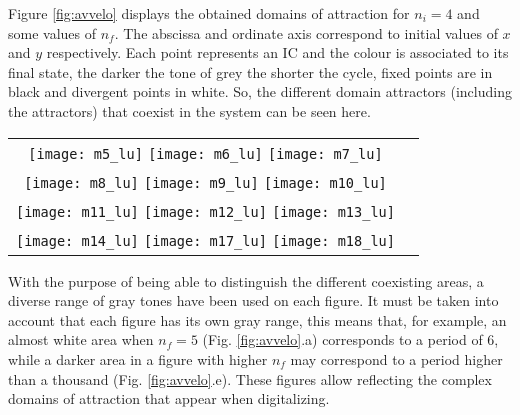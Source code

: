 Figure \ref{fig:avvelo} displays the obtained domains of attraction for $n_i=4$ and some values of $n_f$.
The abscissa and ordinate axis correspond to initial values of $x$ and $y$ respectively.
Each point represents an IC and the colour is associated to its final state,  the darker the tone of grey the shorter the cycle, fixed points are in black and divergent points in white.
So, the different domain attractors (including the attractors) that coexist in the system can be seen here.
%
\begin{figure*}
  \centering
\begin{tabular}{cc}
\texttt{[image: m5\_lu]}
\texttt{[image: m6\_lu]}
\texttt{[image: m7\_lu]}\\
\texttt{[image: m8\_lu]}
\texttt{[image: m9\_lu]}
\texttt{[image: m10\_lu]}\\
\texttt{[image: m11\_lu]}
\texttt{[image: m12\_lu]}
\texttt{[image: m13\_lu]}\\
\texttt{[image: m14\_lu]}
\texttt{[image: m17\_lu]}
\texttt{[image: m18\_lu]}\\
\end{tabular}
\caption{Coexisting areas in attraction domains for: (a) $n_f=5$, (b) $n_f=6$, (c) $n_f=7$, (d) $n_f=8$, (e) $n_f=9$, (f) $n_f=10$, (g) $n_f=11$, (h) $n_f=12$, (i) $n_f=13$, (j) $n_f=14$, (k) $n_f=17$, (l) $n_f=18$.}
\label{fig:avvelo}
\end{figure*}

With the purpose of being able to distinguish the different coexisting areas, a diverse range of gray tones have been used on each figure.
It must be taken into account that each figure has its own gray range, this means that, for example, an almost white area when $n_f = 5$ (Fig. \ref{fig:avvelo}.a) corresponds to a period of $6$, while a darker area in a figure with higher $n_f$ may correspond to a period higher than a thousand (Fig. \ref{fig:avvelo}.e).
These figures allow reflecting the  complex domains of attraction that appear when digitalizing.

